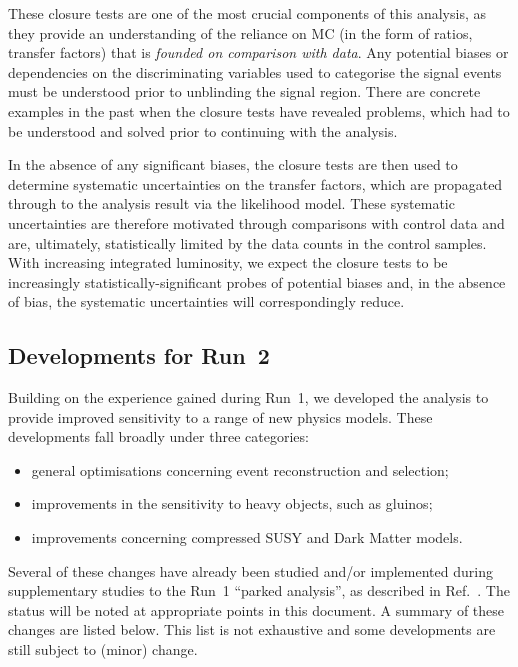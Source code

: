 These closure tests are one of the most crucial components of this
analysis, as they provide an understanding of the reliance on MC (in
the form of ratios, \ie transfer factors) that is {\it founded on
  comparison with data}. Any potential biases or dependencies on the
discriminating variables used to categorise the signal events must be
understood prior to unblinding the signal region. There are concrete
examples in the past when the closure tests have revealed problems,
which had to be understood and solved prior to continuing with the
analysis.

In the absence of any significant biases, the closure tests are then
used to determine systematic uncertainties on the transfer factors,
which are propagated through to the analysis result via the likelihood
model. These systematic uncertainties are therefore motivated through
comparisons with control data and are, ultimately, statistically
limited by the data counts in the control samples. With increasing
integrated luminosity, we expect the closure tests to be increasingly
statistically-significant probes of potential biases and, in the
absence of bias, the systematic uncertainties will correspondingly
reduce.

\subsection{Developments for Run~2}
\label{sec:changes}

Building on the experience gained during Run~1, we developed the
analysis to provide improved sensitivity to a range of new physics
models. These developments fall broadly under three categories:

\begin{itemize}
\item general optimisations concerning event reconstruction and
  selection;
\item improvements in the sensitivity to heavy objects, such as gluinos;
\item improvements concerning compressed SUSY and Dark Matter
  models. 
\end{itemize}

Several of these changes have already been studied and/or implemented
during supplementary studies to the Run~1 ``parked analysis'', as
described in Ref.~\cite{CMS_AN_2013-366}. The status will be noted at
appropriate points in this document. A summary of these changes are
listed below. This list is not exhaustive and some developments are
still subject to (minor) change.


